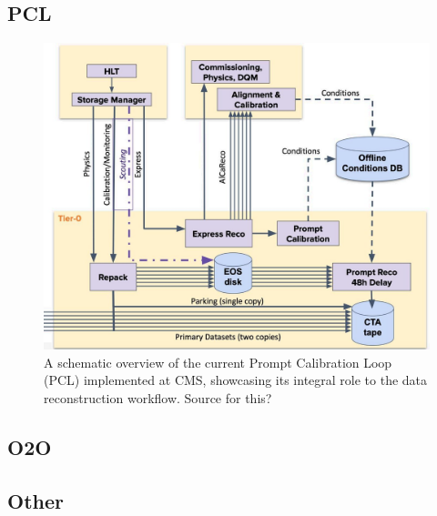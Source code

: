 



\subsection{PCL}

\begin{figure}[h!]	
\centering
\includegraphics[width=\textwidth]{figures/PCL.jpg} %
\caption{A schematic overview of the current Prompt Calibration Loop (PCL) implemented at CMS, showcasing its integral role to the data reconstruction workflow. Source for this?}
\label{fig:PCL}
\end{figure}

\subsection{O2O}
\subsection{Other}

